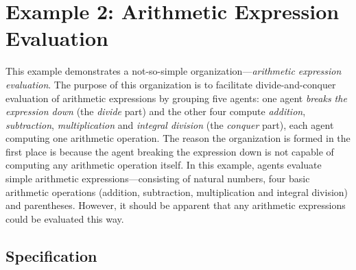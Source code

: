 
\section{Example 2: Arithmetic Expression Evaluation}

This example demonstrates a not-so-simple organization---\textit{arithmetic expression evaluation}.
The purpose of this organization is to facilitate divide-and-conquer evaluation of arithmetic expressions by grouping five agents: one agent \textit{breaks the expression down} (the \textit{divide} part) and the other four compute \textit{addition}, \textit{subtraction}, \textit{multiplication} and \textit{integral division} (the \textit{conquer} part), each agent computing one arithmetic operation.
The reason the organization is formed in the first place is because the agent breaking the expression down is not capable of computing any arithmetic operation itself.
In this example, agents evaluate simple arithmetic expressions---consisting of natural numbers, four basic arithmetic operations (addition, subtraction, multiplication and integral division) and parentheses. However, it should be apparent that any arithmetic expressions could be evaluated this way.

\subsection*{Specification}

